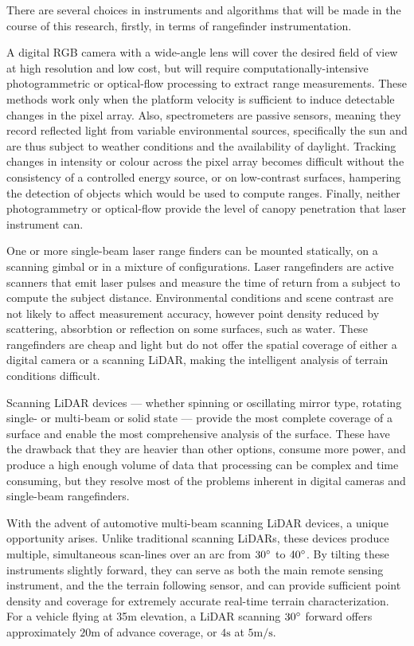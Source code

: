 \documentclass[10pt,a4paper]{report}
\begin{document}
There are several choices in instruments and algorithms that will be made in the course of this research, firstly, in terms of rangefinder instrumentation.

A digital RGB camera with a wide-angle lens will cover the desired field of view at high resolution and low cost, but will require computationally-intensive photogrammetric or optical-flow processing to extract range measurements. These methods work only when the platform velocity is sufficient to induce detectable changes in the pixel array. Also, spectrometers are passive sensors, meaning they record reflected light from variable environmental sources, specifically the sun and are thus subject to weather conditions and the availability of daylight. Tracking changes in intensity or colour across the pixel array becomes difficult without the consistency of a controlled energy source, or on low-contrast surfaces, hampering the detection of objects which would be used to compute ranges. Finally, neither photogrammetry or optical-flow provide the level of canopy penetration that laser instrument can.

One or more single-beam laser range finders can be mounted statically, on a scanning gimbal or in a mixture of configurations. Laser rangefinders are active scanners that emit laser pulses and measure the time of return from a subject to compute the subject distance. Environmental conditions and scene contrast are not likely to affect measurement accuracy, however point density reduced by scattering, absorbtion or reflection on some surfaces, such as water. These rangefinders are cheap and light but do not offer the spatial coverage of either a digital camera or a scanning LiDAR, making the intelligent analysis of terrain conditions difficult.

Scanning LiDAR devices --- whether spinning or oscillating mirror type, rotating single- or multi-beam or solid state --- provide the most complete coverage of a surface and enable the most comprehensive analysis of the surface. These have the drawback that they are heavier than other options,  consume more power, and produce a high enough volume of data that processing can be complex and time consuming, but they resolve most of the problems inherent in digital cameras and single-beam rangefinders.

With the advent of automotive multi-beam scanning LiDAR devices, a unique opportunity arises. Unlike traditional scanning LiDARs, these devices produce multiple, simultaneous scan-lines over an arc from $30\degree$ to $40\degree$. By tilting these instruments slightly forward, they can serve as both the main remote sensing instrument, and the the terrain following sensor, and can provide sufficient point density and coverage for extremely accurate real-time terrain characterization. For a vehicle flying at 35m elevation, a LiDAR scanning $30\degree$ forward offers approximately $20\si{\m}$ of advance coverage, or $4\si{\s}$ at $5\si{\m\per\s}$. 
\end{document}
